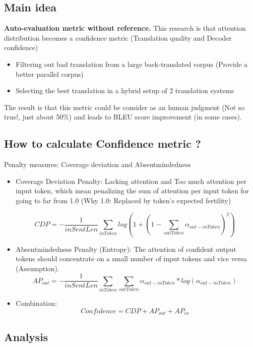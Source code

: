 \documentclass{article}
\begin{document}
\subsection{Main idea}
\textbf{Auto-evaluation metric without reference.}
This research is that attention distribution becomes a confidence metric (Translation quality and Decoder confidence)
\begin{itemize}
\item Filtering out bad translation from a large back-translated corpus (Provide a better parallel corpus)
\item Selecting the best translation in a hybrid setup of 2 translation systems
\end{itemize}
The result is that this metric could be consider as an human judgment (Not so true!, just about 50\%) and leads to BLEU score improvement (in some cases).

\subsection{How to calculate Confidence metric ?}
Penalty measures: Coverage deviation and Absentmindedness
\begin{itemize}
\item Coverage Deviation Penalty: Lacking attention and Too much attention per input token, which mean penalizing the sum of attention per input token for going to far from 1.0 (Why 1.0: Replaced by token's expected fertility)

\begin{equation}
CDP = -\frac{1}{inSentLen}\sum_{inToken} log(1 + (1 - \sum_{outToken} \alpha_{out-inToken})^2 )
\end{equation}

\item Absentmindedness Penalty (Entropy): The attention of confident output tokens should concentrate on a small number of input tokens and vice versa (Assumption).
\begin{equation}
AP_{out} = -\frac{1}{inSentLen}\sum_{inToken} \sum_{outToken} \alpha_{out-inToken} * log (\alpha_{out-inToken})
\end{equation}

\item Combination:
\begin{equation}
Confidence = CDP + AP_{out} + AP_{in}
\end{equation}
\end{itemize}

\subsection{Analysis}
\end{document}
